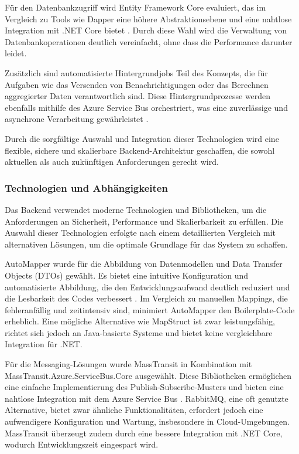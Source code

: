 Für den Datenbankzugriff wird Entity Framework Core evaluiert, das im Vergleich zu Tools wie Dapper eine höhere Abstraktionsebene und eine nahtlose Integration mit .NET Core bietet \cite{entityFrameworkCore2020}. Durch diese Wahl wird die Verwaltung von Datenbankoperationen deutlich vereinfacht, ohne dass die Performance darunter leidet. 

Zusätzlich sind automatisierte Hintergrundjobs Teil des Konzepts, die für Aufgaben wie das Versenden von Benachrichtigungen oder das Berechnen aggregierter Daten verantwortlich sind. Diese Hintergrundprozesse werden ebenfalls mithilfe des Azure Service Bus orchestriert, was eine zuverlässige und asynchrone Verarbeitung gewährleistet \cite{backgroundTasks2017}.

Durch die sorgfältige Auswahl und Integration dieser Technologien wird eine flexible, sichere und skalierbare Backend-Architektur geschaffen, die sowohl aktuellen als auch zukünftigen Anforderungen gerecht wird.


\subsubsection*{Technologien und Abhängigkeiten}
Das Backend verwendet moderne Technologien und Bibliotheken, um die Anforderungen an Sicherheit, Performance und Skalierbarkeit zu erfüllen. Die Auswahl dieser Technologien erfolgte nach einem detaillierten Vergleich mit alternativen Lösungen, um die optimale Grundlage für das System zu schaffen.

AutoMapper wurde für die Abbildung von Datenmodellen und Data Transfer Objects (DTOs) gewählt. Es bietet eine intuitive Konfiguration und automatisierte Abbildung, die den Entwicklungsaufwand deutlich reduziert und die Lesbarkeit des Codes verbessert \cite{automapperDocs}. Im Vergleich zu manuellen Mappings, die fehleranfällig und zeitintensiv sind, minimiert AutoMapper den Boilerplate-Code erheblich. Eine mögliche Alternative wie MapStruct ist zwar leistungsfähig, richtet sich jedoch an Java-basierte Systeme und bietet keine vergleichbare Integration für .NET.

Für die Messaging-Lösungen wurde MassTransit in Kombination mit MassTransit.Azure.ServiceBus.Core ausgewählt. Diese Bibliotheken ermöglichen eine einfache Implementierung des Publish-Subscribe-Musters und bieten eine nahtlose Integration mit dem Azure Service Bus \cite{masstransit2021}. RabbitMQ, eine oft genutzte Alternative, bietet zwar ähnliche Funktionalitäten, erfordert jedoch eine aufwendigere Konfiguration und Wartung, insbesondere in Cloud-Umgebungen. MassTransit überzeugt zudem durch eine bessere Integration mit .NET Core, wodurch Entwicklungszeit eingespart wird.

